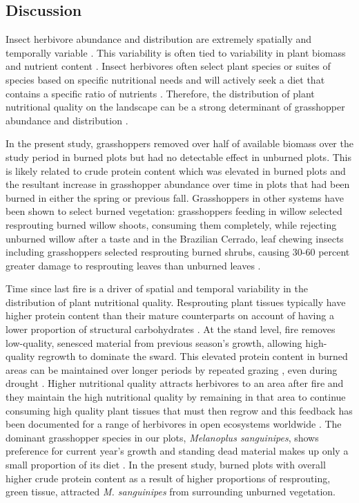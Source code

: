\documentclass[referee, 
	            sn-basic]
           {sn-jnl}
\begin{document}
\begin{linenumbers}
\section{Discussion}

Insect herbivore abundance and distribution are extremely spatially and temporally variable \citep{cappuccino1995}. This variability is often tied to variability in plant biomass and nutrient content \citep{joern2012}. Insect herbivores often select plant species or suites of species based on specific nutritional needs \citep{ibanez2013, behmer2008} and will actively seek a diet that contains a specific ratio of nutrients \citep{behmer2009}. Therefore, the distribution of plant nutritional quality on the landscape can be a strong determinant of grasshopper abundance and distribution \citep{white2012, joern2012, ozment2021}. 

In the present study, grasshoppers removed over half of available biomass over the study period in burned plots but had no detectable effect in unburned plots. This is likely related to crude protein content which was elevated in burned plots and the resultant increase in grasshopper abundance over time in plots that had been burned in either the spring or previous fall. Grasshoppers in other systems have been shown to select burned vegetation: grasshoppers feeding in willow selected resprouting burned willow shoots, consuming them completely, while rejecting unburned willow after a taste \citep{stein1992} and in the Brazilian Cerrado, leaf chewing insects including grasshoppers selected resprouting burned shrubs, causing 30-60 percent greater damage to resprouting leaves than unburned leaves \citep{lopes2011}. 

Time since last fire is a driver of spatial and temporal variability in the distribution of plant nutritional quality. Resprouting plant tissues typically have higher protein content than their mature counterparts on account of having a lower proportion of structural carbohydrates \citep{mcgranahan2021}. 
At the stand level, fire removes low-quality, senesced material from previous season's growth, allowing high-quality regrowth to dominate the sward.  
This elevated protein content in burned areas can be maintained over longer periods by repeated grazing \citep{wanchuk2021}, even during drought \citep{spiess2020}. 
Higher nutritional quality attracts herbivores to an area after fire and they maintain the high nutritional quality by remaining in that area to continue consuming high quality plant tissues that must then regrow and this feedback has been documented for a range of herbivores in open ecosystems worldwide \citep{allred2011, archibald2005, sensenig2010}. 
The dominant grasshopper species in our plots, \emph{Melanoplus sanguinipes}, shows preference for current year's growth and standing dead material makes up only a small proportion of its diet \citep{anderson1952, mulkern1962}.
In the present study, burned plots with overall higher crude protein content as a result of higher proportions of resprouting, green tissue, attracted \emph{M. sanguinipes} from surrounding unburned vegetation.



\end{linenumbers}
\end{document}
